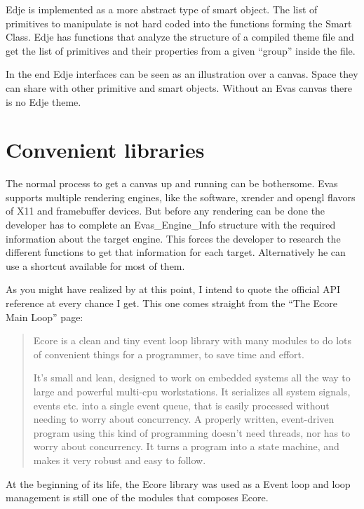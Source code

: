 \documentclass[12pt,a4paper,english]{book}
\begin{document}
Edje is implemented as a more abstract type of smart object. The list of
primitives to manipulate is not hard coded into the functions forming the Smart
Class. Edje has functions that analyze the structure of a compiled theme file
and get the list of primitives and their properties from a given ``group'' inside
the file.

In the end Edje interfaces can be seen as an illustration over a canvas. Space
they can share with other primitive and smart objects. Without an Evas canvas
there is no Edje theme.



\hypertarget{convenient-libraries}{}
\section{Convenient libraries}
\label{convenient-libraries}

The normal process to get a canvas up and running can be bothersome. Evas
supports multiple rendering engines, like the software, xrender and opengl
flavors of X11 and framebuffer devices. But before any rendering can be done
the developer has to complete an Evas{\_}Engine{\_}Info structure with the required
information about the target engine. This forces the developer to research the
different functions to get that information for each target. Alternatively he
can use a shortcut available for most of them.

As you might have realized by at this point, I intend to quote the official API
reference at every chance I get. This one comes straight from the ``The Ecore
Main Loop'' page:
\begin{quote}

Ecore is a clean and tiny event loop library with many modules to do lots
of convenient things for a programmer, to save time and effort.

It's small and lean, designed to work on embedded systems all the way to
large and powerful multi-cpu workstations. It serializes all system
signals, events etc. into a single event queue, that is easily processed
without needing to worry about concurrency. A properly written,
event-driven program using this kind of programming doesn't need threads,
nor has to worry about concurrency. It turns a program into a state
machine, and makes it very robust and easy to follow.
\end{quote}

At the beginning of its life, the Ecore library was used as a Event loop and
loop management is still one of the modules that composes Ecore.
\end{document}
